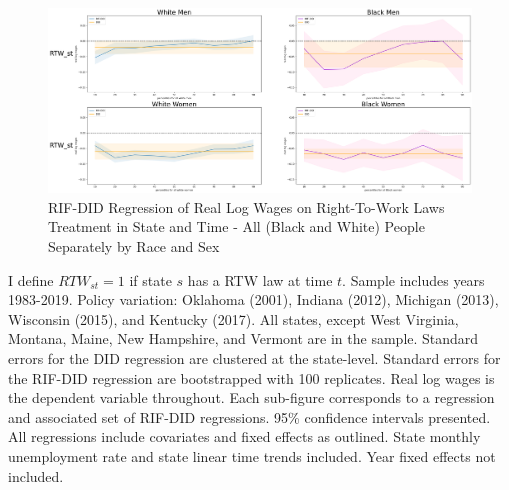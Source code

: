 \documentclass[11pt]{article}
\begin{document}
{\pagebreak
\begin{landscape}
\begin{figure}[ht!]
\centering
    \caption{RIF-DID Regression of Real Log Wages on Right-To-Work Laws Treatment in State and Time - All (Black and White) People Separately by Race and Sex}\label{fig:rifdid-sltt-bw-A}
    \includegraphics[width=1.25\textwidth, height = \textheight, keepaspectratio]{figures/fin_rifdid-sltt-bw-A.png}
\end{figure}
\footnotesize{I define $RTW_{st} = 1$ if state $s$ has a RTW law at time $t$. Sample includes years 1983-2019. Policy variation: Oklahoma (2001), Indiana (2012), Michigan (2013), Wisconsin (2015), and Kentucky (2017). All states, except West Virginia, Montana, Maine, New Hampshire, and Vermont are in the sample. Standard errors for the DID regression are clustered at the state-level. Standard errors for the RIF-DID regression are bootstrapped with 100 replicates. Real log wages is the dependent variable throughout. Each sub-figure corresponds to a regression and associated set of RIF-DID regressions. 95\% confidence intervals presented. All regressions include covariates and fixed effects as outlined. State monthly unemployment rate and state linear time trends included. Year fixed effects not included.}
\end{landscape}

}
\end{document}
